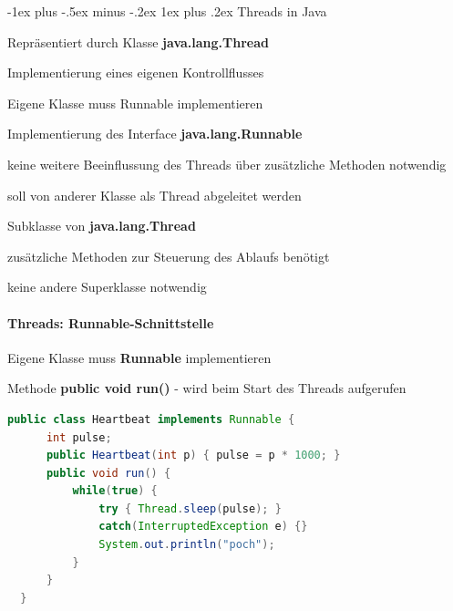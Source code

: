 \documentclass[10pt]{article}
\makeatletter
\renewcommand{\subsubsection}{\@startsection{subsubsection}{3}{0mm}%
                                {-1ex plus -.5ex minus -.2ex}%
                                {1ex plus .2ex}%
                                {\normalfont\small\bfseries}}
\makeatother
\begin{document}
  \subsubsection{Threads in Java}
  \begin{itemize*}
    \item Repräsentiert durch Klasse \textbf{java.lang.Thread}
    \item Implementierung eines eigenen Kontrollflusses
    \item Eigene Klasse muss Runnable implementieren
    \begin{itemize*}
      \item Implementierung des Interface \textbf{java.lang.Runnable}
      \begin{itemize*}
        \item keine weitere Beeinflussung des Threads über zusätzliche Methoden notwendig
        \item soll von anderer Klasse als Thread abgeleitet werden
      \end{itemize*}
      \item Subklasse von \textbf{java.lang.Thread}
      \begin{itemize*}
        \item zusätzliche Methoden zur Steuerung des Ablaufs benötigt
        \item keine andere Superklasse notwendig
      \end{itemize*}
    \end{itemize*}
  \end{itemize*}
  
  \paragraph{Threads: Runnable-Schnittstelle}
  Eigene Klasse muss \textbf{Runnable} implementieren
  \begin{itemize*}
    \item Methode \textbf{public void run()} - wird beim Start des Threads aufgerufen
  \end{itemize*}
  \begin{lstlisting}[language=java]
  public class Heartbeat implements Runnable {
      int pulse;
      public Heartbeat(int p) { pulse = p * 1000; }
      public void run() {
          while(true) {
              try { Thread.sleep(pulse); }
              catch(InterruptedException e) {}
              System.out.println("poch");
          }
      }
  }
  \end{lstlisting}
\end{document}

